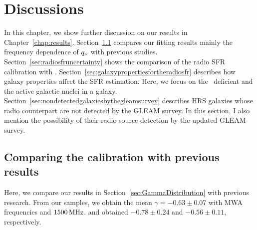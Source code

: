 \chapter{Discussions}\label{chap:discussions}
\begin{chapabstract}

In this chapter, we show further discussion on our results in Chapter~\ref{chap:results}.
Section~\ref{sec:comparingthecalibration} compares our fitting results mainly the frequency dependence of $q_{\nu}$ with previous studies.
Section~\ref{sec:radiosfruncertainty} shows the comparison of the radio SFR calibration with \citet{CalistroRivera2017a}.
Section~\ref{sec:galaxypropertiesfortheradiosfr} describes how galaxy properties affect the SFR estimation.
Here, we focus on the \nh~deficient and the active galactic nuclei in a galaxy.
Section~\ref{sec:nondetectedgalaxiesbythegleamsurvey} describes HRS galaxies whose radio counterpart are not detected by the GLEAM survey.
In this section, I also mention the possibility of their radio source detection by the updated GLEAM survey.

\end{chapabstract}

\section{Comparing the calibration with previous results}\label{sec:comparingthecalibration}

Here, we compare our results in Section~\ref{sec:GammaDistribution} with previous research.
From our samples, we obtain the mean $\gamma=-0.63 \pm 0.07$ with MWA frequencies and $1500\,\mathrm{MHz}$.
\citet{CalistroRivera2017a} and \citet{Chyzy2018} obtained $-0.78 \pm 0.24$ and $-0.56 \pm 0.11$, respectively.

